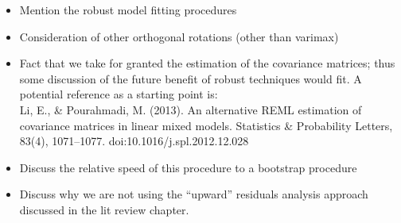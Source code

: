 \documentclass[12pt]{article} %
\begin{document}




\begin{itemize}
\item Mention the robust model fitting procedures
\item Consideration of other orthogonal rotations (other than varimax)
\item Fact that we take for granted the estimation of the covariance matrices; thus some discussion of the future benefit of robust techniques would fit. A potential reference as a starting point is:\\ Li, E., \& Pourahmadi, M. (2013). An alternative REML estimation of covariance matrices in linear mixed models. Statistics \& Probability Letters, 83(4), 1071--1077. doi:10.1016/j.spl.2012.12.028
\item Discuss the relative speed of this procedure to a bootstrap procedure
\item Discuss why we are not using the ``upward'' residuals analysis approach discussed in the lit review chapter.
\end{itemize}
\end{document}
